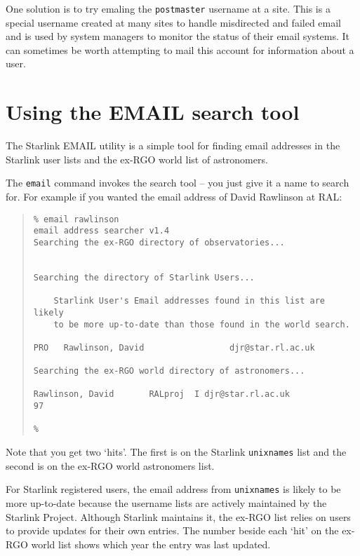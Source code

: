 \documentclass[twoside,11pt]{article}
\newcommand{\xlabel}[1]{}
\renewcommand{\_}{\texttt{\symbol{95}}}
\begin{document}
One solution is to try emaling the \texttt{postmaster} username at a site.
This is a special username created at many sites to handle misdirected and 
failed email and is used by system managers to monitor the status of their 
email systems.  It can sometimes be worth attempting to mail this account for
information about a user.

\section{\xlabel{using_the_email_search_tool}Using the EMAIL search tool}
\label{using_the_email_search_tool}

The Starlink EMAIL utility is a simple tool for finding email addresses in 
the Starlink user lists and the ex-RGO world list of astronomers.

The \texttt{email} command invokes the search tool -- you just give it a 
name to search for.  For example if you wanted the email address of 
David Rawlinson at RAL:

\begin{quote}
\begin{small}
\begin{verbatim}
% email rawlinson
email address searcher v1.4
Searching the ex-RGO directory of observatories...


Searching the directory of Starlink Users...

    Starlink User's Email addresses found in this list are likely
    to be more up-to-date than those found in the world search.

PRO   Rawlinson, David                 djr@star.rl.ac.uk 

Searching the ex-RGO world directory of astronomers...

Rawlinson, David       RALproj  I djr@star.rl.ac.uk                         97

%
\end{verbatim} 
\end{small}
\end{quote}

Note that you get two `hits'.  The first is on the Starlink \texttt{unixnames}
list and the second is on the ex-RGO world astronomers list.  

For Starlink registered users, the email address from \texttt{unixnames}
is likely to be more up-to-date because the username lists are actively
maintained by the Starlink Project.  Although Starlink maintains it, the 
ex-RGO list relies on users to provide updates for their own entries.
The number beside each `hit' on the ex-RGO world list shows which year
the entry was last updated.

\end{document}
